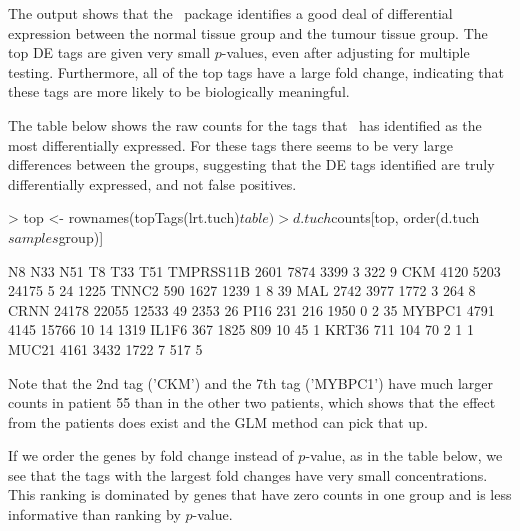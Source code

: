 The output shows that the \edgeR~package identifies a good deal of
differential expression between the normal tissue group and the tumour
tissue group. The top DE tags are given very small $p$-values, even
after adjusting for multiple testing. Furthermore, all of the top tags
have a large fold change, indicating that these tags are more likely
to be biologically meaningful.

The table below shows the raw counts for the tags that \edgeR~has
identified as the most differentially expressed. For these tags there
seems to be very large differences between the groups, suggesting that
the DE tags identified are truly differentially expressed, and not
false positives.

\begin{Schunk}
\begin{Sinput}
> top <- rownames(topTags(lrt.tuch)$table)
> d.tuch$counts[top, order(d.tuch$samples$group)]
\end{Sinput}
\begin{Soutput}
             N8   N33   N51 T8  T33  T51
TMPRSS11B  2601  7874  3399  3  322    9
CKM        4120  5203 24175  5   24 1225
TNNC2       590  1627  1239  1    8   39
MAL        2742  3977  1772  3  264    8
CRNN      24178 22055 12533 49 2353   26
PI16        231   216  1950  0    2   35
MYBPC1     4791  4145 15766 10   14 1319
IL1F6       367  1825   809 10   45    1
KRT36       711   104    70  2    1    1
MUC21      4161  3432  1722  7  517    5
\end{Soutput}
\end{Schunk}

Note that the 2nd tag ('CKM') and the 7th tag ('MYBPC1') have much
larger counts in patient 55 than in the other two patients, which
shows that the effect from the patients does exist and the GLM method
can pick that up.

If we order the genes by fold change instead of $p$-value, as in the
table below, we see that the tags with the largest fold changes have
very small concentrations. This ranking is dominated by genes that
have zero counts in one group and is less informative than ranking by
$p$-value.

